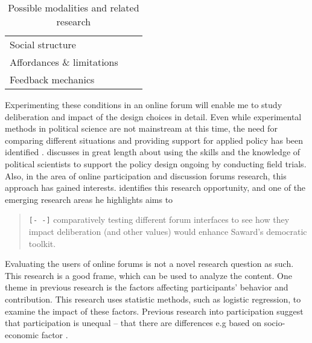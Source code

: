 \documentclass{article}
\begin{document}
\begin{table}
\begin{tabular}{lc|l}
Social structure & & \cite{sukumaran11,underhill03} \\
Affordances \& limitations & & \cite{eklundh94,danet98,donath99} \\ 
Feedback mechanics & &
\end{tabular} 
\caption{Possible modalities and related research}
\label{tab:modalities}
\end{table}

Experimenting these conditions in an online forum will enable me to study deliberation and impact of the design choices in detail. Even while experimental methods in political science are not mainstream at this time, the need for comparing different situations and providing support for applied policy has been identified \cite{green03}.  discusses in great length about using the skills and the knowledge of political scientists to support the policy design ongoing by conducting field trials. Also, in the area of online participation and discussion forums research, this approach has gained interests.  identifies this research opportunity, and one of the emerging research areas he highlights aims to

\begin{quote}
\texttt{[- -]} comparatively testing different forum interfaces to see how they impact deliberation (and other values) would enhance Saward’s democratic toolkit.
\end{quote}

Evaluating the users of online forums is not a novel research question as such. This research is a good frame, which can be used to analyze the content. One theme in previous research is the factors affecting participants' behavior and contribution. This research uses statistic methods, such as logistic regression, to examine the impact of these factors. Previous research into participation suggest that participation is unequal -- that there are differences e.g  based on socio-economic factor .
\end{document}
